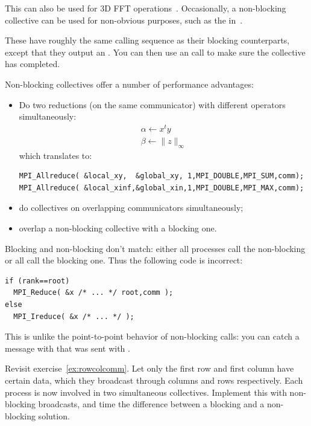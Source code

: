 This can also be used for 3D FFT operations~\cite{Hoefler:case-for-nbc}.
Occasionally, a non-blocking collective can be used for non-obvious purposes,
such as the  in~\cite{Hoefler:2010:SCP}.

These have roughly the same calling sequence as their blocking counterparts,
except that they output an . You
can then use an  call to make sure the collective
has completed.

Non-blocking collectives offer a number of performance advantages:
\begin{itemize}
\item Do two reductions (on the same communicator) with different
  operators simultaneously:
\[ 
\begin{array}{l}
  \alpha\leftarrow x^ty\\
  \beta\leftarrow \|z\|_\infty
\end{array}
\]
which translates to:
\begin{lstlisting}
MPI_Allreduce( &local_xy,  &global_xy, 1,MPI_DOUBLE,MPI_SUM,comm);
MPI_Allreduce( &local_xinf,&global_xin,1,MPI_DOUBLE,MPI_MAX,comm);
\end{lstlisting}
\item do collectives on overlapping communicators simultaneously;
\item overlap a non-blocking collective with a blocking one.
\end{itemize}

\begin{remark}
  Blocking and non-blocking don't match: either all processes
  call the non-blocking or all call the blocking one.
  Thus the following code is incorrect:
\begin{lstlisting}
if (rank==root)
  MPI_Reduce( &x /* ... */ root,comm );
else
  MPI_Ireduce( &x /* ... */ );
\end{lstlisting}
  This is unlike the point-to-point behavior of non-blocking calls:
  you can catch a message with 
  that was sent with .
\end{remark}

\begin{exercise}
  \label{ex:procgridnonblock}
  Revisit exercise~\ref{ex:rowcolcomm}. Let only the first row and
  first column have certain data, which they broadcast through columns
  and rows respectively. Each process is now involved in two
  simultaneous collectives. Implement this with non-blocking
  broadcasts, and time the difference between a blocking and a
  non-blocking solution.
\end{exercise}

